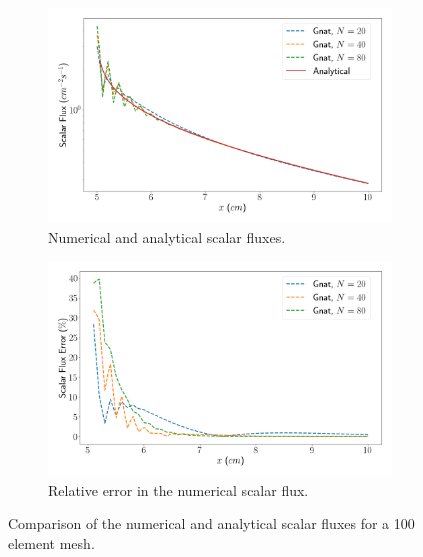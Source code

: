 \begin{figure}[H]
    \centering
    \begin{subfigure}[b]{0.495\textwidth}
        \centering
        \includegraphics[width=\textwidth]{images/verification/1d_slab/1D_analytical_flux_2.png}
        \caption{Numerical and analytical scalar fluxes.}
        \label{fig:verification:1D_flux:100_elem}
    \end{subfigure}
    \hfill
    \begin{subfigure}[b]{0.495\textwidth}
        \centering
        \includegraphics[width=\textwidth]{images/verification/1d_slab/1D_analytical_flux_error_2.png}
        \caption{Relative error in the numerical scalar flux.}
        \label{fig:verification:1D_flux:100_elem_error}
    \end{subfigure}
    \caption{Comparison of the numerical and analytical scalar fluxes for a 100 element mesh.}
    \label{fig:verification:1D_flux_100_elem}
\end{figure}
